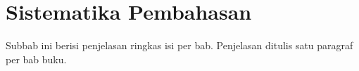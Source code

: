 \section{Sistematika Pembahasan}

Subbab ini berisi penjelasan ringkas isi per bab. Penjelasan ditulis satu paragraf per bab buku.